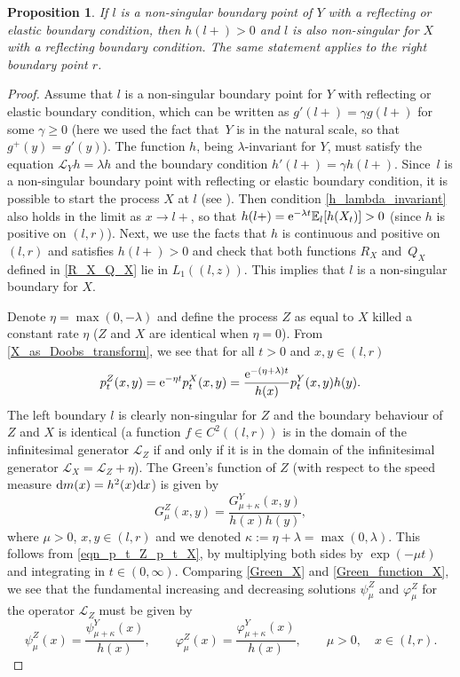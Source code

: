 \documentclass[10pt,a4paper]{amsart}
\numberwithin{equation}{section}
\newtheorem{Proposition}[Theorem]{Proposition}
\theoremstyle{definition}
\def\L{{\mathcal L}}
\def\e{{\mathbb E}}
\def\d{{\textnormal d}}
\begin{document}
\begin{Proposition}\label{prop_reflecting}
If $l$ is a non-singular boundary point of $Y$ with a reflecting or elastic boundary condition, then $h(l+)>0$ and $l$ is also
non-singular for $X$ with a reflecting boundary condition. The same statement applies to the right boundary point $r$.
\end{Proposition}
\begin{proof}
Assume that $l$ is a non-singular boundary point for $Y$ with reflecting or elastic boundary condition, which can be written as $g'(l+)=\gamma g(l+)$ for some $\gamma \ge 0$ (here we used the fact that~$Y$ is in the natural scale, so that $g^+(y)=g'(y)$). The function $h$, being $\lambda$-invariant for $Y$, must satisfy the equation $\L_Y h = \lambda h$ and the boundary condition $h'(l+)=\gamma h(l+)$. Since~$l$ is a non-singular boundary point with reflecting or elastic boundary condition, it is possible to start the process $X$ at $l$ (see \cite[Section II.6]{Borodin2002}). Then condition \eqref{h_lambda_invariant} also holds in the limit as $x \to l+$, so that $h(l+)={\rm e}^{-\lambda t} \e_l[h(X_t)]>0$ (since $h$ is positive on $(l,r)$). Next, we use the facts that $h$ is continuous and positive on $(l,r)$ and satisfies $h(l+)>0$ and check that both functions $R_X$ and~$Q_X$ defined in \eqref{R_X_Q_X} lie in $L_1((l,z))$. This implies that $l$ is a non-singular boundary for $X$.

Denote $\eta=\max(0,-\lambda)$ and define the process $Z$ as equal to $X$ killed a constant rate $\eta$ ($Z$ and $X$ are identical when $\eta=0$). From \eqref{X_as_Doobs_transform}, we see that for all $t>0$ and $x,y \in (l,r)$
\begin{equation}\label{eqn_p_t_Z_p_t_X}
p_t^Z(x,y)={\rm e}^{-\eta t} p_t^X(x,y)=\frac{{\rm e}^{-(\eta+\lambda) t}}{h(x)} p_t^Y (x,y) h(y).
\end{equation}
The left boundary $l$ is clearly non-singular for $Z$ and the boundary behaviour of $Z$ and $X$ is identical (a function $f\in C^2((l,r))$ is in the domain of the infinitesimal generator ${\mathcal L}_Z$ if and only if it is in the domain of the infinitesimal generator ${\mathcal L}_X={\mathcal L}_Z+\eta$).
The Green's function of $Z$ (with respect to the speed measure $\d m(x)=h^2(x) \d x$) is given by
\begin{equation}\label{Green_function_X}
G^Z_{\mu}(x,y)=\frac{G^Y_{\mu+\kappa}(x,y)}{h(x) h(y)},
\end{equation}
where $\mu>0$, $x,y \in (l,r)$ and we denoted $\kappa:=\eta+\lambda=\max(0,\lambda)$. This follows from \eqref{eqn_p_t_Z_p_t_X}, by multiplying both sides by $\exp(-\mu t)$ and integrating in $t \in (0,\infty)$. Comparing \eqref{Green_X} and \eqref{Green_function_X}, we see that the fundamental increasing and decreasing solutions $\psi^Z_{\mu}$ and $\varphi^Z_{\mu}$ for the operator $\L_Z$ must be given by
\[
\psi^Z_{\mu}(x)=\frac{\psi^Y_{\mu+\kappa}(x)}{h(x)}, \qquad
\varphi^Z_{\mu}(x)=\frac{\varphi^Y_{\mu+\kappa}(x)}{h(x)}, \qquad \mu>0,\quad  x\in (l,r).
\]


\end{proof}
\end{document}
